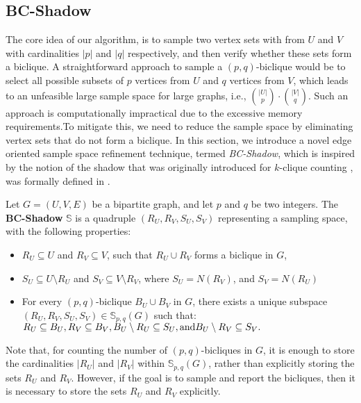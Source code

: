 \subsection{BC-Shadow}
The core idea of our algorithm, is to sample two vertex sets with from $U$ and $V$ with cardinalities $|p|$ and $|q|$ respectively, and then verify whether these sets form a biclique. A straightforward approach to sample a $(p,q)$-biclique would be to select all possible subsets of $p$ vertices from $U$ and $q$ vertices from $V$, which leads to an unfeasible large sample space for large graphs, i.e., $\binom{|U|}{p} \cdot \binom{|V|}{q}$. Such an approach is computationally impractical due to the excessive memory requirements.To mitigate this, we need to reduce the sample space by eliminating vertex sets that do not form a biclique. In this section, we introduce a novel edge oriented sample space refinement technique, termed \textit{BC-Shadow}, which is inspired by the notion of the shadow that was originally introduced for $k$-clique counting \cite{turanshadow}, was formally defined in \cite{citation}.

\begin{definition}[BC-Shadow]
	Let $G = (U, V, E)$ be a bipartite graph, and let $p$ and $q$ be two integers. The \textbf{BC-Shadow} $\mathbb{S}$ is a quadruple $(R_U, R_V, S_U, S_V)$ representing a sampling space, with the following properties:
	\begin{itemize}
		\item $R_U \subseteq U$ and $R_V \subseteq V$, such that $R_U \cup R_V$ forms a biclique in $G$,
		\item $S_U \subseteq U \setminus R_U$ and $S_V \subseteq V \setminus R_V$, where  $S_U = N(R_V)$, and $S_V = N(R_U)$
		\item For every $(p,q)$-biclique $B_U \cup B_V$ in $G$, there exists a unique subspace $(R_U, R_V, S_U, S_V) \in \mathbb{S}_{p,q}(G)$ such that: $R_U \subseteq B_U, \\  R_V \subseteq B_V ,  B_U \setminus R_U \subseteq S_U, \text{and} B_U \setminus R_V \subseteq S_V.$
	\end{itemize}
\end{definition}

Note that, for counting the number of $(p,q)$-bicliques in $G$, it is enough to store the cardinalities $|R_U|$ and $|R_V|$ within $\mathbb{S}_{p,q}(G)$, rather than explicitly storing the sets $R_U$ and $R_V$. However, if the goal is to sample and report the bicliques, then it is necessary to store the sets $R_U$ and $R_V$ explicitly.

